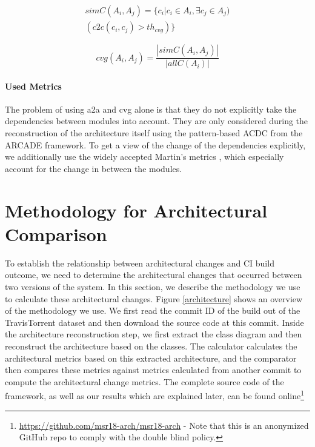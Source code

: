 \documentclass[sigplan, anonymous, review]{acmart}
\begin{document}
\begin{equation} \label{eq:simC}
\begin{split}
simC(A_i, A_j) = \{c_i | c_i \in A_i, \exists c_j \in A_j) \\ 
(c2c(c_i, c_j) > th_{cvg})\}
\end{split}
\end{equation}

\begin{equation} \label{eq:cvg}
cvg(A_i, A_j) = \frac{|simC(A_i, A_j)|}{|allC(A_i)|}
\end{equation}

\paragraph{Used Metrics} 
The problem of using a2a and cvg alone is that they do not explicitly take the dependencies between modules into account. 
They are only considered during the reconstruction of the architecture itself using the pattern-based ACDC from the ARCADE framework.
To get a view of the change of the dependencies explicitly, we additionally use the widely accepted Martin's metrics \cite{Val-MartinsMet}, which especially account for the change in between the modules. 

\section{Methodology for Architectural Comparison}

To establish the relationship between architectural changes and CI build outcome, we need to determine the architectural changes that occurred between two versions of the system.
In this section, we describe the methodology we use to calculate these architectural changes.
Figure \ref{architecture} shows an overview of the methodology we use.
We first read the commit ID of the build out of the TravisTorrent dataset and then download the source code at this commit. Inside the architecture reconstruction step, we first extract the class diagram and then reconstruct the architecture based on the classes. 
The calculator calculates the architectural metrics based on this extracted architecture, and the comparator then compares these metrics against metrics calculated from another commit to compute the architectural change metrics. 
The complete source code of the framework, as well as our results which are explained later, can be found online\footnote{\url{https://github.com/msr18-arch/msr18-arch} - Note that this is an anonymized GitHub repo to comply with the double blind policy.}
 
\end{document}
